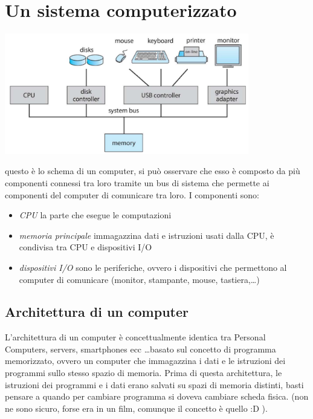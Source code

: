 \documentclass{article}
\begin{document}
\section{Un sistema computerizzato}

    \begin{center}
    \includegraphics[width=0.8\textwidth]{immagini/immagine.png}
    \end{center}
    questo è lo schema di un computer, si può osservare che esso è composto da più componenti connessi tra loro tramite un bus di sistema che permette ai componenti del computer di comunicare tra loro. I componenti sono:

    \begin{itemize}

        \item \textit{CPU}
         la parte che esegue le computazioni

        \item\textit{memoria principale}
        immagazzina dati e istruzioni usati dalla CPU, è condivisa tra CPU e dispositivi I/O

        \item\textit{dispositivi I/O}
        sono le periferiche, ovvero i dispositivi che permettono al computer di comunicare (monitor, stampante, mouse, tastiera,\ldots)

    \end{itemize}

    
    \subsection{Architettura di un computer}
        L'architettura di un computer è concettualmente identica tra Personal Computers, servers, smartphones ecc \ldots basato sul concetto di programma memorizzato, ovvero un computer che immagazzina i dati e le istruzioni dei programmi sullo stesso spazio di memoria. Prima di questa architettura, le istruzioni dei programmi e i dati erano salvati su spazi di memoria distinti, basti pensare a quando per cambiare programma si doveva cambiare scheda fisica. (non ne sono sicuro, forse era in un film, comunque il concetto è quello :D ).
\end{document}

